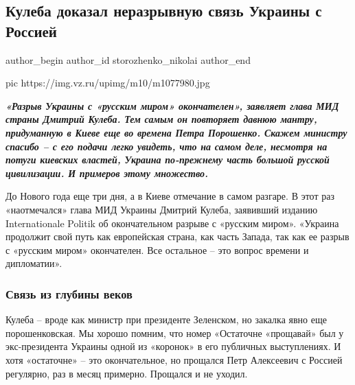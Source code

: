  
 
 
 
 
 
\subsection{Кулеба доказал неразрывную связь Украины с Россией}
\label{sec:28_12_2020.news.ru.vz.storozhenko_nikolai.1.russia_ukraina_svjaz}
\ifcmt
	author_begin
   author_id storozhenko_nikolai
	author_end
\fi

\ifcmt
  pic https://img.vz.ru/upimg/m10/m1077980.jpg
\fi

\begin{leftbar}
  \begingroup
    \em\Large\bfseries\color{blue}
«Разрыв Украины с «русским миром» окончателен», заявляет глава МИД страны
Дмитрий Кулеба. Тем самым он повторяет давнюю мантру, придуманную в Киеве еще
во времена Петра Порошенко. Скажем министру спасибо – с его подачи легко
увидеть, что на самом деле, несмотря на потуги киевских властей, Украина
по-прежнему часть большой русской цивилизации. И примеров этому множество.
  \endgroup
\end{leftbar}

До Нового года еще три дня, а в Киеве отмечание в самом разгаре. В этот раз
«наотмечался» глава МИД Украины Дмитрий Кулеба, заявивший изданию
Internationale Politik об окончательном разрыве с «русским миром». «Украина
продолжит свой путь как европейская страна, как часть Запада, так как ее разрыв
с «русским миром» окончателен. Все остальное – это вопрос времени и
дипломатии».  

\subsubsection{Связь из глубины веков}

Кулеба – вроде как министр при президенте Зеленском, но закалка явно еще
порошенковская. Мы хорошо помним, что номер «Остаточне «прощавай» был у
экс-президента Украины одной из «коронок» в его публичных выступлениях. И хотя
«остаточне» – это окончательное, но прощался Петр Алексеевич с Россией
регулярно, раз в месяц примерно. Прощался и не уходил. 

